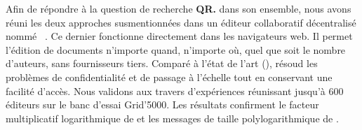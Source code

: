 Afin de répondre à la question de recherche \textbf{QR.} dans son ensemble, nous
avons réuni les deux approches susmentionnées dans un éditeur collaboratif
décentralisé nommé \CRATE~\cite{nedelec2016crate}. Ce dernier fonctionne
directement dans les navigateurs web. Il permet l'édition de documents n'importe
quand, n'importe où, quel que soit le nombre d'auteurs, sans fournisseurs
tiers. Comparé à l'état de l'art (\REF), \CRATE résoud les problèmes de
confidentialité et de passage à l'échelle tout en conservant une facilité
d'accès. Nous validons \CRATE aux travers d'expériences réunissant jusqu'à 600
éditeurs sur le banc d'essai Grid'5000. Les résultats confirment le facteur
multiplicatif logarithmique de \SPRAY et les messages de taille
polylogarithmique de \LSEQ.



